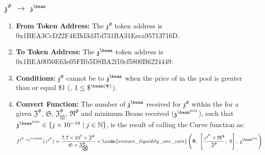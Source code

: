 \documentclass[class=article, crop=false]{standalone}
\begin{document}
\subsubsection{$\mathfrak{z}^{\Phi}$ $\rightarrow$ $\mathfrak{z}^{\bean}$}
    \begin{enumerate}
        \item \textbf{From Token Address:} The $\mathfrak{z}^{\Phi}$ token address is 0x1BEA3CcD22F4EBd3d37d731BA31Eeca95713716D.
        \item \textbf{To Token Address:} The $\mathfrak{z}^{\bean}$ token address is 0x1BEA0050E63e05FBb5D8BA2f10cf5800B6224449.
        \item \textbf{Conditions:}  $\mathfrak{z}^{\Phi}$ cannot be  to  $\mathfrak{z}^{\bean}$ when the price of  in the pool is greater than or equal \$1 (, $1 \leq \$^{\bean(\Phi)}$). 
        \item \textbf{Convert Function:} The number of $\mathfrak{z}^{\bean}$ received for   $\mathfrak{z}^{\Phi}$ within the  for a given $\mathfrak{Z}^{\Phi}$, $\mathfrak{S}$, $\mathfrak{Z}_{\bigotimes}^{\Phi}$, $\mathfrak{R}^{\Phi}$ and minimum  Beans received ($\mathfrak{z}^{\bean^{\text{min}}}$), such that $\mathfrak{z}^{\bean^{\text{min}}} \in \{j \times 10^{-18} \mid j \in \mathbb{N} \}$, is the result of calling the Curve  function as:
$$f^{\mathfrak{z}^{\Phi} \rightarrow \mathfrak{z}^{\tinybean}}(z^{\mathfrak{z}^{\Phi}}) = \frac{7.7 \times 10^{7} \times \mathfrak{Z}^{\Phi}}{\mathfrak{S} \times \mathfrak{Z}_{\bigotimes}^{\Phi}} \times \code{remove\_liquidity\_one\_coin}\left( \Phi,\ \left[\frac{z^{\mathfrak{z}^{\Phi}} \times \mathfrak{R}^{\Phi}}{\mathfrak{Z}^{\Phi}},\ 0\right],\ \mathfrak{z}^{\bean^{\text{min}}} \right)$$
    \end{enumerate}
\end{document}
